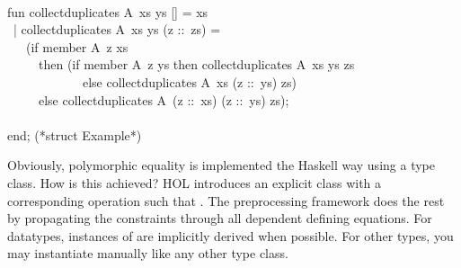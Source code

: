 \begin{isabellebody}
\begin{isamarkuptext}
\hspace*{0pt}\\
\hspace*{0pt}fun collect{}duplicates A{}~xs ys [] = xs\\
\hspace*{0pt} ~| collect{}duplicates A{}~xs ys (z ::~zs) =\\
\hspace*{0pt} ~~~(if member A{}~z xs\\
\hspace*{0pt} ~~~~~then (if member A{}~z ys then collect{}duplicates A{}~xs ys zs\\
\hspace*{0pt} ~~~~~~~~~~~~else collect{}duplicates A{}~xs (z ::~ys) zs)\\
\hspace*{0pt} ~~~~~else collect{}duplicates A{}~(z ::~xs) (z ::~ys) zs);\\
\hspace*{0pt}\\
\hspace*{0pt}end; (*struct Example*)%
\end{isamarkuptext}%
\isamarkuptrue%
%
\endisatagquote
{\isafoldquote}%
%
\isadelimquote
%
\endisadelimquote
%
\begin{isamarkuptext}%
\noindent Obviously, polymorphic equality is implemented the Haskell
  way using a type class.  How is this achieved?  HOL introduces
  an explicit class  with a corresponding operation
   such that .
  The preprocessing framework does the rest by propagating the
   constraints through all dependent defining equations.
  For datatypes, instances of  are implicitly derived
  when possible.  For other types, you may instantiate 
  manually like any other type class.


\end{isamarkuptext}
\end{isabellebody}
